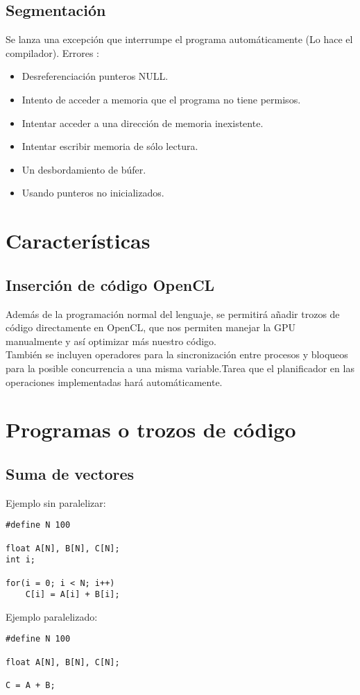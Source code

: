 \documentclass[12pt,a4paper]{article}
\begin{document}
\subsection{Segmentación}
Se lanza una excepción que interrumpe el programa automáticamente (Lo hace el
compilador).
Errores :
\begin{itemize}
\item Desreferenciación punteros NULL.
\item Intento de acceder a memoria que el programa no tiene permisos.
\item Intentar acceder a una dirección de memoria inexistente.
\item Intentar escribir memoria de sólo lectura.
\item Un desbordamiento de búfer. 
\item Usando punteros no inicializados.
\end{itemize}
\section{Características}
\subsection{Inserción de código OpenCL}
Además de la programación normal del lenguaje, se permitirá añadir trozos de
código directamente en OpenCL, que nos permiten manejar la GPU manualmente y así
optimizar más nuestro código. 
 \\ También se incluyen operadores para la sincronización entre procesos y
 bloqueos para la posible concurrencia a una misma variable.Tarea que el
 planificador en las operaciones implementadas hará automáticamente.
\section{Programas o trozos de código}
\subsection{Suma de vectores}
Ejemplo sin paralelizar:
\begin{lstlisting}
#define N 100

float A[N], B[N], C[N];
int i;

for(i = 0; i < N; i++)
	C[i] = A[i] + B[i];
\end{lstlisting}

Ejemplo paralelizado:
\begin{lstlisting}
#define N 100

float A[N], B[N], C[N];

C = A + B;
\end{lstlisting}
\end{document}
